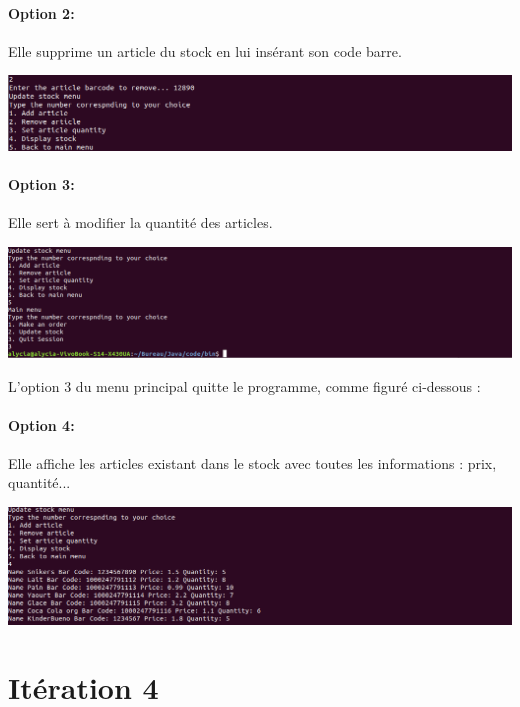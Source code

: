 \documentclass[french,10pt,a4paper]{report}
\begin{document}
\paragraph{\textbf{Option 2:}}    Elle supprime un article du stock en lui insérant son code barre.
\begin{center}
	\includegraphics[scale=0.3]{captures/g_it3_13.png}
\end{center} 

\paragraph{\textbf{Option 3:}}  Elle sert à modifier la quantité des articles.
\begin{center}
	\includegraphics[scale=0.26]{captures/g_it3_15.png}
\end{center} 
L’option 3 du menu principal quitte le programme, comme figuré ci-dessous :

\paragraph{\textbf{Option 4:}}  Elle affiche les articles existant dans le stock avec toutes les informations : prix, quantité...
\begin{center}
	\includegraphics[scale=0.27]{captures/g_it3_14.png}
\end{center} 


\section{\textcolor{rr}{Itération 4}}
\end{document}
